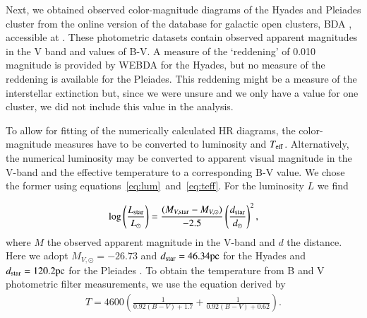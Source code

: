 \documentclass{aa}
\newcommand{\Sun}[0]{\ensuremath{_{\odot}}}
\begin{document}
    Next, we obtained observed color-magnitude diagrams of the Hyades and Pleiades cluster from the online version of the database for galactic open clusters, BDA \citep{1995ASSL..203..127M}, accessible at \citep{webda}. These photometric datasets contain observed apparent magnitudes in the V band and values of B-V. A measure of the `reddening' of 0.010 magnitude is provided by WEBDA for the Hyades, but no measure of the reddening is available for the Pleiades. This reddening might be a measure of the interstellar extinction but, since we were unsure and we only have a value for one cluster, we did not include this value in the analysis. 

    To allow for fitting of the numerically calculated HR diagrams, the color-magnitude measures have to be converted to luminosity and $T_{\rm eff}$. Alternatively, the numerical luminosity may be converted to apparent visual magnitude in the V-band and the effective temperature to a corresponding B-V value. We chose the former using equations~\eqref{eq:lum}~and~\eqref{eq:teff}. For the luminosity $L$ we find


\begin{eqnarray}
    \log \left(\frac{L_{\rm star}}{L\Sun}\right) = \frac{(M_{V,\rm star}-M_{V,\odot})}{-2.5} \left(\frac{d_{\rm star}}{d\Sun}\right)^2 \label{eq:lum},
\end{eqnarray}
where $M$ the observed apparent magnitude in the V-band and $d$ the distance. Here we adopt $M_{V, \odot} = -26.73$ \citep{1957ApJ...126..266S} and $d_{\rm star} = 46.34 \text{pc}$ for the Hyades \citep{1998A&A...331...81P} and $d_{\rm star} = 120.2 \text{pc}$ for the Pleiades \citep{2009A&A...497..209V}. To obtain the temperature from B and V photometric filter measurements, we use the equation derived by \citet{2012EL.....9734008B}
\begin{eqnarray}
    T = 4600 \left(\frac{1}{0.92 (B-V) + 1.7} + \frac{1}{0.92(B-V) + 0.62} \right) \label{eq:teff}.
\end{eqnarray}
\end{document}
